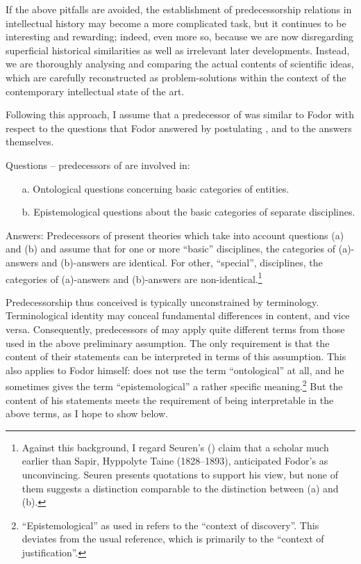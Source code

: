 \documentclass[output=paper]{langscibook}
\begin{document}
If the above pitfalls are avoided, the establishment of predecessorship relations in intellectual history may become a more complicated task, but it continues to be interesting and rewarding; indeed, even more so, because we are now disregarding superficial historical similarities as well as irrelevant later developments. Instead, we are thoroughly analysing and comparing the actual contents of scientific ideas, which are carefully reconstructed as problem-solutions within the context of the contemporary intellectual state of the art.\label{q:elffers:probsols}

Following this approach, I assume that a predecessor of  was similar to Fodor with respect to the questions that Fodor answered by postulating , and to the answers themselves.

Questions -- predecessors of  are involved in:

\begin{enumerate}
    \item[a.] Ontological questions concerning basic categories of entities.
    \item[b.] Epistemological questions about the basic categories of separate disciplines.
\end{enumerate}

Answers: Predecessors of  present theories which take into account questions (a) and (b) and assume that for one or more ``basic'' disciplines, the categories of (a)-answers and (b)-answers are identical. For other, ``special'', disciplines, the categories of (a)-answers and (b)-answers are non-identical.\footnote{Against this background, I regard Seuren's (\citeyear[827--832]{Seuren2016}) claim that a scholar much earlier than Sapir, Hyppolyte Taine (1828--1893), anticipated Fodor's  as unconvincing. Seuren presents quotations to support his view, but none of them suggests a distinction comparable to the distinction between (a) and (b).}

Predecessorship thus conceived is typically unconstrained by terminology. Terminological identity may conceal fundamental differences in content, and vice versa. Consequently, predecessors of  may apply quite different terms from those used in the above preliminary assumption. The only requirement is that the content of their statements can be interpreted in terms of this assumption. This also applies to Fodor himself: \citet{Fodor1974} does not use the term ``ontological'' at all, and he sometimes gives the term ``epistemological'' a rather specific meaning.\footnote{``Epistemological'' as used in \citet[113]{Fodor1974} refers to the ``context of discovery''. This deviates from the usual reference, which is primarily to the ``context of justification''.\label{fn:elffers:6}} But the content of his statements meets the requirement of being interpretable in the above terms, as I hope to show below.
\end{document}
